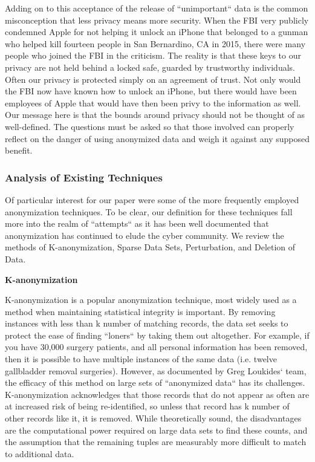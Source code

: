 \documentclass[10pt,journal,compsoc]{IEEEtran}
\begin{document}
	Adding on to this acceptance of the release of ``unimportant`` data is the common misconception that less privacy means more security.  When the FBI very publicly condemned Apple for not helping it unlock an iPhone that belonged to a gunman who helped kill fourteen people in San Bernardino, CA in 2015, there were many people who joined the FBI in the criticism.  The reality is that these keys to our privacy are not held behind a locked safe, guarded by trustworthy individuals.  Often our privacy is protected simply on an agreement of trust.  Not only would the FBI now have known how to unlock an iPhone, but there would have been employees of Apple that would have then been privy to the information as well.  Our message here is that the bounds around privacy should not be thought of as well-defined.  The questions must be asked so that those involved can properly reflect on the danger of using anonymized data and weigh it against any supposed benefit.
	


\subsubsection{Analysis of Existing Techniques}

	Of particular interest for our paper were some of the more frequently employed anonymization techniques.  To be clear, our definition for these techniques fall more into the realm of ``attempts`` as it has been well documented that anonymization has continued to elude the cyber community.  We review the methods of K-anonymization, Sparse Data Sets, Perturbation, and Deletion of Data.
\linebreak	

\noindent \textbf{K-anonymization}

	K-anonymization is a popular anonymization technique, most widely used as a method when maintaining statistical integrity is important.  By removing instances with less than k number of matching records, the data set seeks to protect the ease of finding ``loners`` by taking them out altogether.  For example, if you have 30,000 surgery patients, and all personal information has been removed, then it is possible to have multiple instances of the same data (i.e. twelve gallbladder removal surgeries).  However, as documented by Greg Loukides` team,  the efficacy of this method on large sets of ``anonymized data``  has its challenges\cite{loukides}.  K-anonymization acknowledges that those records that do not appear as often are at increased risk of being re-identified, so unless that record has k number of other records like it, it is removed.  While theoretically sound, the disadvantages are the computational power required on large data sets to find these counts, and the assumption that the remaining tuples are measurably more difficult to match to additional data.  
	
\end{document}
